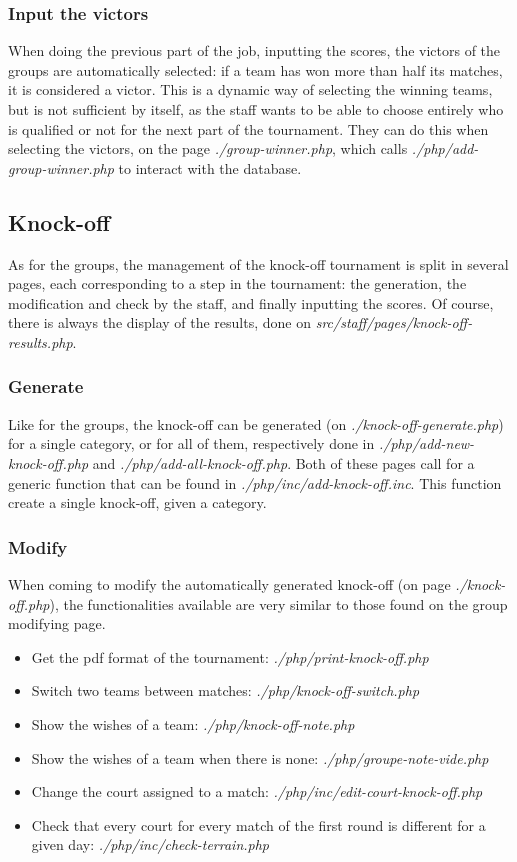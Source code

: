 \documentclass{article}
\begin{document}
\subsubsection{Input the victors}
When doing the previous part of the job, inputting the scores, the victors of the groups are automatically selected: if a team has won more than half its matches, it is considered a victor. This is a dynamic way of selecting the winning teams, but is not sufficient by itself, as the staff wants to be able to choose entirely who is qualified or not for the next part of the tournament. They can do this when selecting the victors, on the page \textit{./group-winner.php}, which calls \textit{./php/add-group-winner.php} to interact with the database.


\subsection{Knock-off}
As for the groups, the management of the knock-off tournament is split in several pages, each corresponding to a step in the tournament: the generation, the modification and check by the staff, and finally inputting the scores. Of course, there is always the display of the results, done on \textit{src/staff/pages/knock-off-results.php}.

\subsubsection{Generate}
Like for the groups, the knock-off can be generated (on \textit{./knock-off-generate.php}) for a single category, or for all of them, respectively done in \textit{./php/add-new-knock-off.php} and \textit{./php/add-all-knock-off.php}. Both of these pages call for a generic function that can be found in \textit{./php/inc/add-knock-off.inc}. This function create a single knock-off, given a category.

\subsubsection{Modify}
When coming to modify the automatically generated knock-off (on page \textit{./knock-off.php}), the functionalities available are very similar to those found on the group modifying page.

\begin{itemize}
\item Get the pdf format of the tournament: \textit{./php/print-knock-off.php}
\item Switch two teams between matches: \textit{./php/knock-off-switch.php}
\item Show the wishes of a team: \textit{./php/knock-off-note.php}
\item Show the wishes of a team when there is none: \textit{./php/groupe-note-vide.php}
\item Change the court assigned to a match: \textit{./php/inc/edit-court-knock-off.php}
\item Check that every court for every match of the first round is different for a given day: \textit{./php/inc/check-terrain.php}
\end{itemize}
\end{document}
